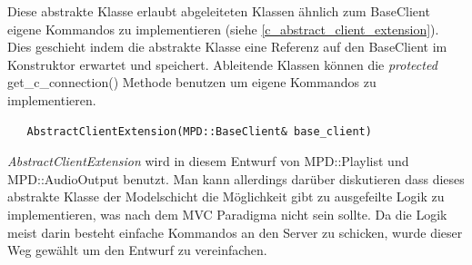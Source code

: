 Diese abstrakte Klasse erlaubt abgeleiteten Klassen ähnlich zum BaseClient eigene Kommandos zu implementieren (siehe \ref{c_abstract_client_extension}).
Dies geschieht indem die abstrakte Klasse eine Referenz auf den BaseClient im Konstruktor erwartet und speichert.
Ableitende Klassen können die \textit{protected} get\_c\_connection() Methode benutzen um eigene Kommandos zu implementieren.

\begin{verbatim}
   AbstractClientExtension(MPD::BaseClient& base_client)
\end{verbatim}

\emph{AbstractClientExtension} wird in diesem Entwurf von MPD::Playlist und MPD::AudioOutput benutzt.
Man kann allerdings darüber diskutieren dass dieses abstrakte Klasse der Modelschicht die Möglichkeit gibt zu ausgefeilte Logik zu implementieren, was nach dem MVC Paradigma nicht sein sollte.  
Da die Logik meist darin besteht einfache Kommandos an den Server zu schicken, wurde dieser Weg gewählt um 
den Entwurf zu vereinfachen.
